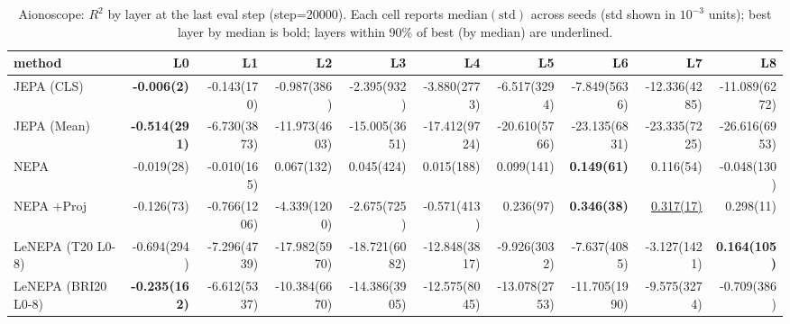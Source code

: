 \begin{table}[t]
\centering
\scriptsize
\caption{Aionoscope: $R^2$ by layer at the last eval step (step=20000). Each cell reports $\mathrm{median}(\mathrm{std})$ across seeds (std shown in $10^{-3}$ units); best layer by median is bold; layers within 90\% of best (by median) are underlined.}
\label{tab:aiono_last_step_by_layer_r2}
\begin{tabular}{lrrrrrrrrr}
\toprule
method & L0 & L1 & L2 & L3 & L4 & L5 & L6 & L7 & L8 \\
\midrule
JEPA (CLS) & \textbf{-0.006(2)} & -0.143(170) & -0.987(386) & -2.395(932) & -3.880(2773) & -6.517(3294) & -7.849(5636) & -12.336(4285) & -11.089(6272) \\
JEPA (Mean) & \textbf{-0.514(291)} & -6.730(3873) & -11.973(4603) & -15.005(3651) & -17.412(9724) & -20.610(5766) & -23.135(6831) & -23.335(7225) & -26.616(6953) \\
NEPA & -0.019(28) & -0.010(165) & 0.067(132) & 0.045(424) & 0.015(188) & 0.099(141) & \textbf{0.149(61)} & 0.116(54) & -0.048(130) \\
NEPA +Proj & -0.126(73) & -0.766(1206) & -4.339(1200) & -2.675(725) & -0.571(413) & 0.236(97) & \textbf{0.346(38)} & \underline{0.317(17)} & 0.298(11) \\
LeNEPA (T20 L0-8) & -0.694(294) & -7.296(4739) & -17.982(5970) & -18.721(6082) & -12.848(3817) & -9.926(3032) & -7.637(4085) & -3.127(1421) & \textbf{0.164(105)} \\
LeNEPA (BRI20 L0-8) & \textbf{-0.235(162)} & -6.612(5337) & -10.384(6670) & -14.386(3905) & -12.575(8045) & -13.078(2753) & -11.705(1990) & -9.575(3274) & -0.709(386) \\
\bottomrule
\end{tabular}
\end{table}
